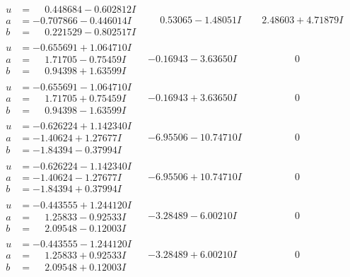 \documentclass[1p]{elsarticle_modified}
\theoremstyle{definition}
\begin{document}
$$\begin{array}{c|c|c}
\begin{aligned}
u &= \phantom{-}0.448684 - 0.602812 I \\
a &= -0.707866 - 0.446014 I \\
b &= \phantom{-}0.221529 - 0.802517 I\end{aligned}
 & \phantom{-}0.53065 - 1.48051 I & \phantom{-}2.48603 + 4.71879 I \\ \hline\begin{aligned}
u &= -0.655691 + 1.064710 I \\
a &= \phantom{-}1.71705 - 0.75459 I \\
b &= \phantom{-}0.94398 + 1.63599 I\end{aligned}
 & -0.16943 - 3.63650 I & \phantom{-0.000000 } 0 \\ \hline\begin{aligned}
u &= -0.655691 - 1.064710 I \\
a &= \phantom{-}1.71705 + 0.75459 I \\
b &= \phantom{-}0.94398 - 1.63599 I\end{aligned}
 & -0.16943 + 3.63650 I & \phantom{-0.000000 } 0 \\ \hline\begin{aligned}
u &= -0.626224 + 1.142340 I \\
a &= -1.40624 + 1.27677 I \\
b &= -1.84394 - 0.37994 I\end{aligned}
 & -6.95506 - 10.74710 I & \phantom{-0.000000 } 0 \\ \hline\begin{aligned}
u &= -0.626224 - 1.142340 I \\
a &= -1.40624 - 1.27677 I \\
b &= -1.84394 + 0.37994 I\end{aligned}
 & -6.95506 + 10.74710 I & \phantom{-0.000000 } 0 \\ \hline\begin{aligned}
u &= -0.443555 + 1.244120 I \\
a &= \phantom{-}1.25833 - 0.92533 I \\
b &= \phantom{-}2.09548 - 0.12003 I\end{aligned}
 & -3.28489 - 6.00210 I & \phantom{-0.000000 } 0 \\ \hline\begin{aligned}
u &= -0.443555 - 1.244120 I \\
a &= \phantom{-}1.25833 + 0.92533 I \\
b &= \phantom{-}2.09548 + 0.12003 I\end{aligned}
 & -3.28489 + 6.00210 I & \phantom{-0.000000 } 0\\

\end{array}$$
\end{document}
